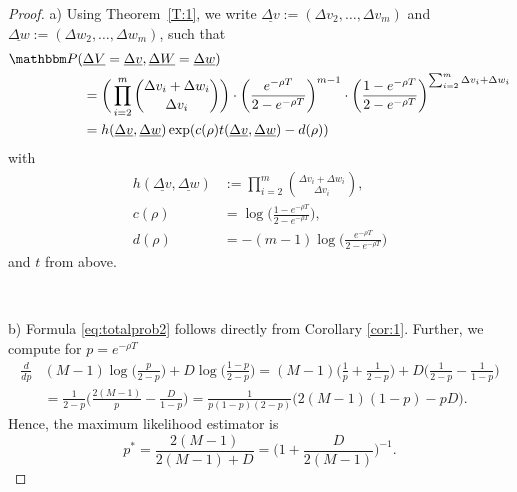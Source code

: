 \documentclass[preprint,authoryear]{elsarticle}
\theoremstyle{definition}
\numberwithin{equation}{section}
\numberwithin{figure}{section}
\begin{document}
\begin{proof}
  a)
  Using Theorem~\ref{T:1}, we write
  $\underline{\Delta v} := (\Delta v_2, \dots, \Delta v_m)$
 and 
  $\underline{\Delta w} := (\Delta w_2, \dots, \Delta w_m)$, such that
  \begin{align*}
    \mathbbm P( & \underline{\Delta V} = \underline{\Delta v}, \underline{\Delta W} = \underline{\Delta w})
    \\ & = 
         \bigg(\prod_{i=2}^m \binom{\Delta v_i + \Delta w_i}{\Delta v_i}\bigg)
         \cdot \bigg(\frac{e^{-\rho T}}{2-e^{-\rho T}} 
         \bigg)^{m-1}
         \cdot \bigg(\frac{1-e^{-\rho T}}{2 - e^{-\rho T}}
         \bigg)^{\sum_{i=2}^m \Delta v_i + \Delta w_i}\\
                & = h(\underline{\Delta v}, \underline{\Delta w}) \exp(c(\rho) 
                  t(\underline{\Delta v}, \underline{\Delta w}) - d(\rho))
  \end{align*}
  with
  \begin{align*}
    h(\underline{\Delta v}, \underline{\Delta w}) & := \prod_{i=2}^m \binom{\Delta v_i + \Delta w_i}{\Delta v_i},\\
    c(\rho) & = \log\bigg(\frac{1-e^{-\rho T}}{2 - e^{-\rho T}}\bigg),\\
    d(\rho) & = - (m-1) \log \bigg(\frac{e^{-\rho T}}{2-e^{-\rho T}} 
         \bigg)
  \end{align*}
  and $t$ from above.
  
  ~
  
  \noindent
  b)
    Formula \eqref{eq:totalprob2} follows directly from
  Corollary \ref{cor:1}. Further, we compute for $p = e^{-\rho T}$
  \begin{align*}
    \frac{d}{dp} & (M-1)\log\Big(\frac{p}{2-p}\Big) + D\log\Big(\frac{1-p}{2-p}\Big)
                   = (M-1) \Big( \frac 1p + \frac{1}{2-p} \Big) + D \Big(\frac{1}{2-p} - \frac{1}{1-p}\Big)
    \\ & = \frac{1}{2-p}\Big(\frac {2(M-1)}{p} -  \frac{D}{1-p}\Big) 
         =  \frac{1}{p(1-p)(2-p)}\bigg(2(M-1)(1-p) - p D\bigg).
  \end{align*}
  Hence, the maximum likelihood estimator is
  $$ p^\ast = \frac{2(M-1)}{2(M-1) + D} = \bigg(1 + \frac{D}{2(M-1)}\bigg)^{-1}.$$
\end{proof}
\end{document}

